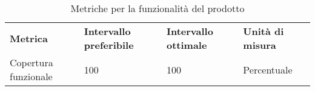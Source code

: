 \renewcommand{\arraystretch}{2.2}
\begin{longtable}{|C{4.5cm}|C{2.25cm}|C{2.25cm}|C{3cm}|}
	
	\caption{Metriche per la funzionalità del prodotto}\\
	\hline
	
	\textbf{Metrica} & \textbf{Intervallo preferibile}  & \textbf{Intervallo ottimale} & \textbf{Unità di misura}
	\tabularnewline
	\endfirsthead
	
	Copertura funzionale &  100 & 100 & Percentuale \\ 

\end{longtable}

